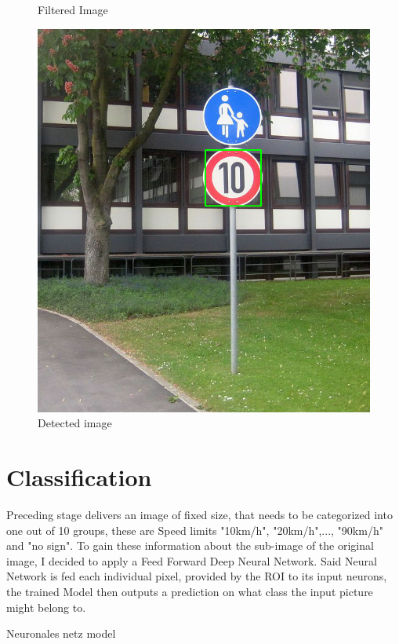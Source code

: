 \begin{figure}[H]
	\caption{Filtered Image}\label{fig:red_filtered_image}
	\endminipage\hfill
	\includegraphics[width=\linewidth]{images/detectedimg.png}
	\caption{Detected image}\label{fig:detected_image}
	\endminipage
\end{figure}

\section{Classification}
Preceding stage delivers an image of fixed size, that needs to be categorized into one out of 10 groups, these are Speed limits "10km/h", "20km/h",..., "90km/h" and "no sign". To gain these information about the sub-image of the original image, I decided to apply a Feed Forward Deep Neural Network. Said Neural Network is fed each individual pixel, provided by the ROI to its input neurons, the trained Model then outputs a prediction on what class the input picture might belong to. 


Neuronales netz model